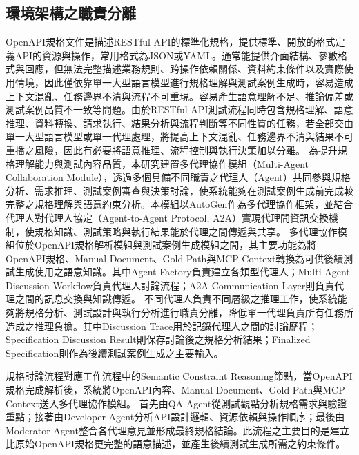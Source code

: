 \begin{ZhChapter}
\subsection{環境架構之職責分離}
\text OpenAPI規格文件是描述RESTful API的標準化規格，提供標準、開放的格式定義API的資源與操作，常用格式為JSON或YAML。通常能提供介面結構、參數格式與回應，但無法完整描述業務規則、跨操作依賴關係、資料約束條件以及實際使用情境，因此僅依靠單一大型語言模型進行規格理解與測試案例生成時，容易造成上下文混亂、任務邊界不清與流程不可重現。容易產生語意理解不足、推論偏差或測試案例品質不一致等問題。由於RESTful API測試流程同時包含規格理解、語意推理、資料轉換、請求執行、結果分析與流程判斷等不同性質的任務，若全部交由單一大型語言模型或單一代理處理，將提高上下文混亂、任務邊界不清與結果不可重播之風險，因此有必要將語意推理、流程控制與執行決策加以分離。
\text 為提升規格理解能力與測試內容品質，本研究建置多代理協作模組（Multi-Agent Collaboration Module），透過多個具備不同職責之代理人（Agent）共同參與規格分析、需求推理、測試案例審查與決策討論，使系統能夠在測試案例生成前完成較完整之規格理解與語意約束分析。本模組以AutoGen作為多代理協作框架，並結合代理人對代理人協定（Agent-to-Agent Protocol, A2A）實現代理間資訊交換機制，使規格知識、測試策略與執行結果能於代理之間傳遞與共享。
\text 多代理協作模組位於OpenAPI規格解析模組與測試案例生成模組之間，其主要功能為將OpenAPI規格、Manual Document、Gold Path與MCP Context轉換為可供後續測試生成使用之語意知識。其中Agent Factory負責建立各類型代理人；Multi-Agent Discussion Workflow負責代理人討論流程；A2A Communication Layer則負責代理之間的訊息交換與知識傳遞。
\text 不同代理人負責不同層級之推理工作，使系統能夠將規格分析、測試設計與執行分析進行職責分離，降低單一代理負責所有任務所造成之推理負擔。其中Discussion Trace用於記錄代理人之間的討論歷程；Specification Discussion Result則保存討論後之規格分析結果；Finalized Specification則作為後續測試案例生成之主要輸入。

\text 規格討論流程對應工作流程中的Semantic Constraint Reasoning節點，當OpenAPI規格完成解析後，系統將OpenAPI內容、Manual Document、Gold Path與MCP Context送入多代理協作模組。
\text 首先由QA Agent從測試觀點分析規格需求與驗證重點；接著由Developer Agent分析API設計邏輯、資源依賴與操作順序；最後由Moderator Agent整合各代理意見並形成最終規格結論。此流程之主要目的是建立比原始OpenAPI規格更完整的語意描述，並產生後續測試生成所需之約束條件。


\end{ZhChapter}
